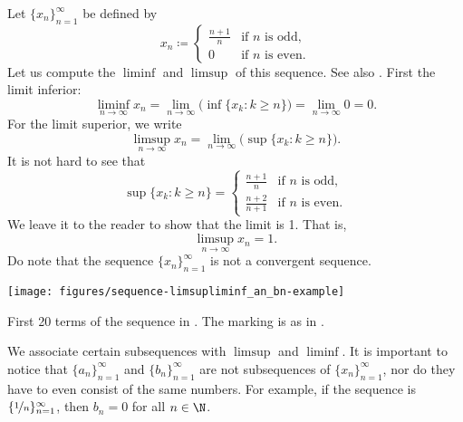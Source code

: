 \begin{example} \label{example:liminfsupex}
Let $\{ x_n \}_{n=1}^\infty$ be defined by
\begin{equation*}
x_n \coloneqq
\begin{cases}
\frac{n+1}{n} & \text{if } n \text{ is odd,} \\
0             & \text{if } n \text{ is even.}
\end{cases}
\end{equation*}
Let us compute the $\liminf$ and $\limsup$ of this sequence.  See also
.  First the
limit inferior:
\begin{equation*}
\liminf_{n\to\infty} x_n = 
\lim_{n\to\infty}
\bigl(
\inf \{ x_k : k \geq n \}
\bigr)
=
\lim_{n\to\infty} 0 = 0 .
\end{equation*}
For the limit superior, we write
\begin{equation*}
\limsup_{n\to\infty} x_n = 
\lim_{n\to\infty}
\bigl(
\sup \{ x_k : k \geq n \}
\bigr) .
\end{equation*}
It is not hard to see that
\begin{equation*}
\sup \{ x_k : k \geq n \} =
\begin{cases}
\frac{n+1}{n}   & \text{if } n \text{ is odd,} \\
\frac{n+2}{n+1} & \text{if } n \text{ is even.}
\end{cases}
\end{equation*}
We leave it to the reader to show that the limit is 1.  That is,
\begin{equation*}
\limsup_{n\to\infty} x_n = 1 .
\end{equation*}
Do note that the sequence $\{ x_n \}_{n=1}^\infty$ is not a convergent sequence.
\begin{myfigureht}
\texttt{[image: figures/sequence-limsupliminf\_an\_bn-example]}
\caption{First 20 terms of the sequence in .
The marking is as in .
\label{sequence-limsupliminf_an_bn-example}}
\end{myfigureht}
\end{example}

We associate certain subsequences with $\limsup$ and $\liminf$.
It is important to notice that $\{ a_n \}_{n=1}^\infty$ and
$\{ b_n \}_{n=1}^\infty$ are not
subsequences of $\{ x_n \}_{n=1}^\infty$, nor do they have to even 
consist of the same numbers.
For example, if the sequence is $\{ \nicefrac{1}{n} \}_{n=1}^\infty$, then
$b_n = 0$ for all $n \in \N$.

